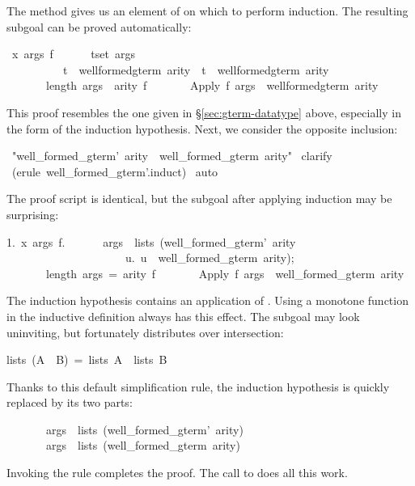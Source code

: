The  method gives
us an element of  on which to perform 
induction.  The resulting subgoal can be proved automatically:
\begin{isabelle}
{}{\isachardot}\ {\isasymAnd}x\ args\ f{\isachardot}\isanewline
\ \ \ \ \ \ {\isasymlbrakk}{\isasymforall}t{\isasymin}set\ args{\isachardot}\isanewline
\ \ \ \ \ \ \ \ \ \ t\ {\isasymin}\ well{\isacharunderscore}formed{\isacharunderscore}gterm\ arity\ {\isasymand}\ t\ {\isasymin}\ well{\isacharunderscore}formed{\isacharunderscore}gterm{\isacharprime}\ arity{\isacharsemicolon}\isanewline
\ \ \ \ \ \ \ length\ args\ {\isacharequal}\ arity\ f{\isasymrbrakk}\isanewline
\ \ \ \ \ \ {\isasymLongrightarrow}\ Apply\ f\ args\ {\isasymin}\ well{\isacharunderscore}formed{\isacharunderscore}gterm{\isacharprime}\ arity%
\end{isabelle}
%
This proof resembles the one given in
{\S}\ref{sec:gterm-datatype} above, especially in the form of the
induction hypothesis.  Next, we consider the opposite inclusion:
\begin{isabelle}
\ "well_formed_gterm'\ arity\ \isasymsubseteq \ well_formed_gterm\ arity"\isanewline
{}\ clarify\isanewline
{}\ (erule\ well_formed_gterm'.induct)\isanewline
{}\ auto\isanewline
{}
\end{isabelle}
%
The proof script is identical, but the subgoal after applying induction may
be surprising:
\begin{isabelle}
1.\ \isasymAnd x\ args\ f.\isanewline
\ \ \ \ \ \ \isasymlbrakk args\ \isasymin \ lists\ (well_formed_gterm'\ arity\ \isasyminter\isanewline
\ \ \ \ \ \ \ \ \ \ \ \ \ \ \ \ \ \ \ \ \ \isacharbraceleft u.\ u\ \isasymin \ well_formed_gterm\ arity\isacharbraceright );\isanewline
\ \ \ \ \ \ \ length\ args\ =\ arity\ f\isasymrbrakk \isanewline
\ \ \ \ \ \ \isasymLongrightarrow \ Apply\ f\ args\ \isasymin \ well_formed_gterm\ arity%
\end{isabelle}
The induction hypothesis contains an application of .  Using a
monotone function in the inductive definition always has this effect.  The
subgoal may look uninviting, but fortunately 
 distributes over intersection:
\begin{isabelle}
lists\ (A\ \isasyminter \ B)\ =\ lists\ A\ \isasyminter \ lists\ B
\end{isabelle}
%
Thanks to this default simplification rule, the induction hypothesis 
is quickly replaced by its two parts:
\begin{isabelle}
\ \ \ \ \ \ \ args\ \isasymin \ lists\ (well_formed_gterm'\ arity)\isanewline
\ \ \ \ \ \ \ args\ \isasymin \ lists\ (well_formed_gterm\ arity)
\end{isabelle}
Invoking the rule  completes the proof.  The
call to
 does all this work.

